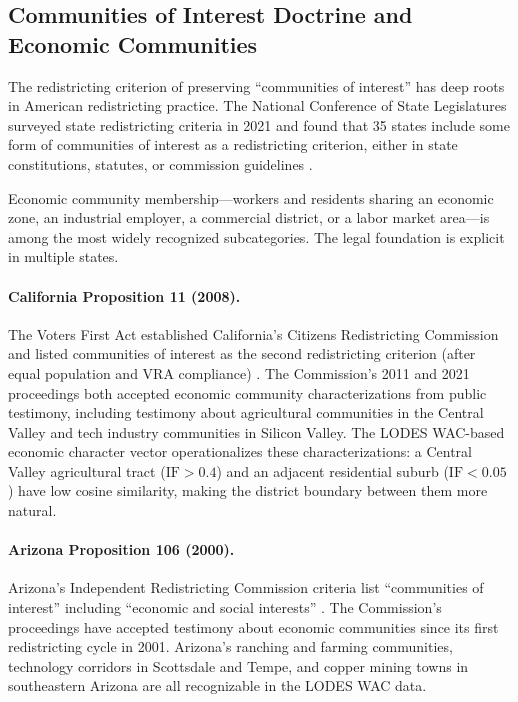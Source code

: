 \label{sec:legal}

\subsection{Communities of Interest Doctrine and Economic Communities}

The redistricting criterion of preserving ``communities of interest'' has
deep roots in American redistricting practice.
The National Conference of State Legislatures surveyed state redistricting
criteria in 2021 and found that 35 states include some form of communities
of interest as a redistricting criterion, either in state constitutions,
statutes, or commission guidelines \citep{ncsl2021criteria}.

Economic community membership---workers and residents sharing an economic
zone, an industrial employer, a commercial district, or a labor market
area---is among the most widely recognized subcategories.
The legal foundation is explicit in multiple states.

\paragraph{California Proposition 11 (2008).}
The Voters First Act established California's Citizens Redistricting
Commission and listed communities of interest as the second redistricting
criterion (after equal population and VRA compliance) \citep{caprop11}.
The Commission's 2011 and 2021 proceedings both accepted economic community
characterizations from public testimony, including testimony about
agricultural communities in the Central Valley and tech industry communities
in Silicon Valley.
The LODES WAC-based economic character vector operationalizes these
characterizations: a Central Valley agricultural tract ($\mathrm{IF} > 0.4$)
and an adjacent residential suburb ($\mathrm{IF} < 0.05$) have low cosine
similarity, making the district boundary between them more natural.

\paragraph{Arizona Proposition 106 (2000).}
Arizona's Independent Redistricting Commission criteria list ``communities
of interest'' including ``economic and social interests'' \citep{azircprop106}.
The Commission's proceedings have accepted testimony about economic communities
since its first redistricting cycle in 2001.
Arizona's ranching and farming communities, technology corridors in
Scottsdale and Tempe, and copper mining towns in southeastern Arizona are
all recognizable in the LODES WAC data.

